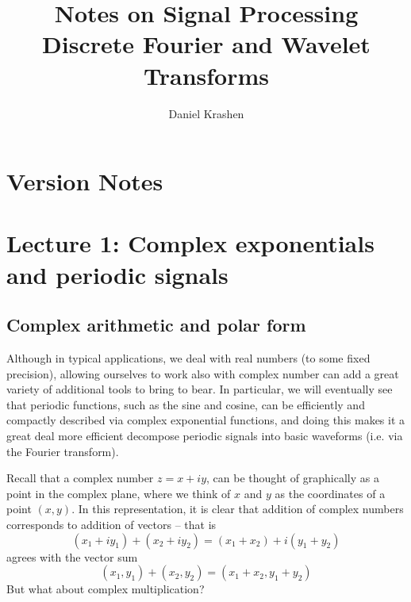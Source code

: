 \documentclass[12pt]{report}
\theoremstyle{plain}
\begin{document}


\author{Daniel Krashen}
\title{Notes on Signal Processing\\Discrete Fourier and Wavelet Transforms}

\maketitle
\tableofcontents


\chapter*{Version Notes}

\iffalse
\section{Updates 1/25/2020}
\begin{itemize}
\item Nothing to say, but generally update information would go here.
\item e.g. added stuff to Section~\ref{lecture 1}
\end{itemize}
\fi

\chapter{Lecture 1: Complex exponentials and periodic signals}

\section{Complex arithmetic and polar form}

Although in typical applications, we deal with real numbers (to some fixed precision), allowing ourselves to work also with complex number can add a great variety of additional tools to bring to bear. In particular, we will eventually see that periodic functions, such as the sine and cosine, can be efficiently and compactly described via complex exponential functions, and doing this makes it a great deal more efficient decompose periodic signals into basic waveforms (i.e. via the Fourier transform).

Recall that a complex number $z = x + iy$, can be thought of graphically as a point in the complex plane, where we think of $x$ and $y$ as the coordinates of a point $(x, y)$. In this representation, it is clear that addition of complex numbers corresponds to addition of vectors -- that is
\[ (x_1 + i y_1) + (x_2 + i y_2) = (x_1 + x_2) + i (y_1 + y_2)\]
agrees with the vector sum
\[ (x_1, y_1) + (x_2, y_2) = (x_1 + x_2, y_1 + y_2) \]
But what about complex multiplication?


%
%
\printindex
\end{document}
